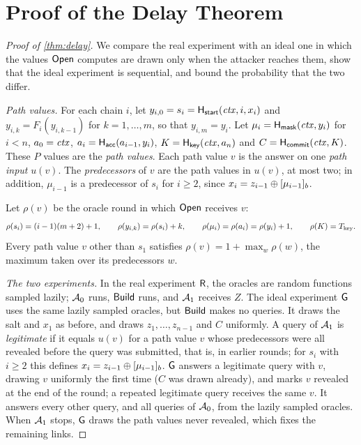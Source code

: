 \section{Proof of the Delay Theorem}\label{app:proof}

\begin{proof}[Proof of \cref{thm:delay}]
We compare the real experiment with an ideal one in which the values $\mathsf{Open}$ computes are drawn only when the attacker reaches them, show that the ideal experiment is sequential, and bound the probability that the two differ.

\emph{Path values.}
For each chain $i$, let $y_{i,0} = s_i = \mathsf{H}_{\mathsf{start}}(\mathit{ctx}, i, x_i)$ and $y_{i,k} = F_i(y_{i,k-1})$ for $k = 1, \dots, m$, so that $y_{i,m} = y_i$. Let $\mu_i = \mathsf{H}_{\mathsf{mask}}(\mathit{ctx}, y_i)$ for $i < n$, $a_0 = \mathit{ctx}$, $a_i = \mathsf{H}_{\mathsf{acc}}(a_{i-1}, y_i)$, $K = \mathsf{H}_{\mathsf{key}}(\mathit{ctx}, a_n)$ and $C = \mathsf{H}_{\mathsf{commit}}(\mathit{ctx}, K)$. These $P$ values are the \emph{path values}. Each path value $v$ is the answer on one \emph{path input} $u(v)$. The \emph{predecessors} of $v$ are the path values in $u(v)$, at most two; in addition, $\mu_{i-1}$ is a predecessor of $s_i$ for $i \ge 2$, since $x_i = z_{i-1} \oplus [\mu_{i-1}]_{b}$.

Let $\rho(v)$ be the oracle round in which $\mathsf{Open}$ receives $v$:
\[
  \rho(s_i) = (i - 1)(m + 2) + 1, \qquad
  \rho(y_{i,k}) = \rho(s_i) + k, \qquad
  \rho(\mu_i) = \rho(a_i) = \rho(y_i) + 1, \qquad
  \rho(K) = T_{\mathrm{key}}.
\]
Every path value $v$ other than $s_1$ satisfies $\rho(v) = 1 + \max_w \rho(w)$, the maximum taken over its predecessors $w$.

\emph{The two experiments.}
In the real experiment $\mathsf{R}$, the oracles are random functions sampled lazily; $\mathcal{A}_0$ runs, $\mathsf{Build}$ runs, and $\mathcal{A}_1$ receives $Z$. The ideal experiment $\mathsf{G}$ uses the same lazily sampled oracles, but $\mathsf{Build}$ makes no queries. It draws the salt and $x_1$ as before, and draws $z_1, \dots, z_{n-1}$ and $C$ uniformly. A query of $\mathcal{A}_1$ is \emph{legitimate} if it equals $u(v)$ for a path value $v$ whose predecessors were all revealed before the query was submitted, that is, in earlier rounds; for $s_i$ with $i \ge 2$ this defines $x_i = z_{i-1} \oplus [\mu_{i-1}]_{b}$. $\mathsf{G}$ answers a legitimate query with $v$, drawing $v$ uniformly the first time ($C$ was drawn already), and marks $v$ revealed at the end of the round; a repeated legitimate query receives the same $v$. It answers every other query, and all queries of $\mathcal{A}_0$, from the lazily sampled oracles. When $\mathcal{A}_1$ stops, $\mathsf{G}$ draws the path values never revealed, which fixes the remaining links.


\end{proof}
